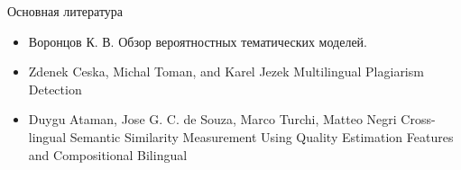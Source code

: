 \documentclass{beamer}
\begin{document}
\begin{frame}{Основная литература}

\begin{itemize}
    \item Воронцов К. В.
    Обзор вероятностных тематических моделей.
    \item Zdenek Ceska, Michal Toman, and Karel Jezek
    Multilingual Plagiarism Detection
    \item Duygu Ataman, Jose G. C. de Souza, Marco Turchi, Matteo Negri
    Cross-lingual Semantic Similarity Measurement Using Quality Estimation Features and Compositional Bilingual
\end{itemize}

\end{frame}
\end{document}
